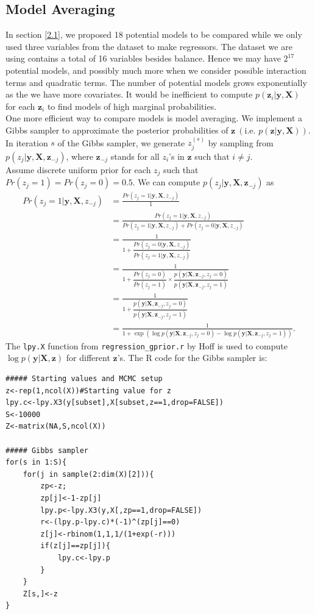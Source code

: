 \documentclass[a4page]{article}
\begin{document}
	\subsection{Model Averaging\label{2.2}}
	In section \ref{2.1}, we proposed 18 potential models to be compared while we only used three variables from the dataset to make regressors. The dataset we are using contains a total of 16 variables besides balance. Hence we may have $2^{17}$ potential models, and possibly much more when we consider possible interaction terms and quadratic terms. The number of potential models grows exponentially as the we have more covariates. It would be inefficient to compute $p(\bm{z}_i|\bm{y},\bm{X})$ for each $\bm{z}_i$ to find models of high marginal probabilities.\\
	One more efficient way to compare models is model averaging. We implement a Gibbs sampler to approximate the posterior probabilities of $\bm{z}\ (\text{i.e. }p(\bm{z}|\bm{y},\bm{X}))$. In iteration $s$ of the Gibbs sampler, we generate $z_j^{(s)}$ by sampling from $p(z_j|\bm{y},\bm{X},\bm{z}_{-j})$, where $\bm{z}_{-j}$ stands for all $z_i$'s in $\bm{z}$ such that $i\neq j$.\\
	Assume discrete uniform prior for each $z_j$ such that $Pr(z_j=1)=Pr(z_j=0)=0.5$. We can compute $p(z_j|\bm{y},\bm{X},\bm{z}_{-j})$ as
	\begin{equation}
		\begin{split}
		Pr(z_j=1|\bm{y},\bm{X},z_{-j})
		&=\frac{Pr(z_j=1|\bm{y},\bm{X},z_{-j})}{1}\\
		&=\frac{Pr(z_j=1|\bm{y},\bm{X},z_{-j})}{Pr(z_j=1|\bm{y},\bm{X},z_{-j})+Pr(z_j=0|\bm{y},\bm{X},z_{-j})}\\
		&=\frac{1}{1+\dfrac{Pr(z_j=0|\bm{y},\bm{X},z_{-j})}{Pr(z_j=1|\bm{y},\bm{X},z_{-j})}}\\
		&=\frac{1}{1+\dfrac{Pr(z_j=0)}{Pr(z_j=1)}\times\dfrac{p(\bm{y}|\bm{X},\bm{z}_{-j},z_j=0)}{p(\bm{y}|\bm{X},\bm{z}_{-j},z_j=1)}}\\
		&=\frac{1}{1+\dfrac{p(\bm{y}|\bm{X},\bm{z}_{-j},z_j=0)}{p(\bm{y}|\bm{X},\bm{z}_{-j},z_j=1)}}\\
		&=\frac{1}{1+ \exp (\log p(\bm{y}|\bm{X},\bm{z}_{-j},z_j=0) - \log p(\bm{y}|\bm{X},\bm{z}_{-j},z_j=1))}.
		\end{split}
	\end{equation}
	The \verb|lpy.X| function from \verb|regression_gprior.r| by Hoff is used to compute $\log p(\bm{y}|\bm{X},\bm{z})$ for different $\bm{z}$'s. The R code for the Gibbs sampler is:
\begin{verbatim}
##### Starting values and MCMC setup
z<-rep(1,ncol(X))#Starting value for z
lpy.c<-lpy.X3(y[subset],X[subset,z==1,drop=FALSE])
S<-10000
Z<-matrix(NA,S,ncol(X))

##### Gibbs sampler
for(s in 1:S){
    for(j in sample(2:dim(X)[2])){
        zp<-z;
        zp[j]<-1-zp[j]
        lpy.p<-lpy.X3(y,X[,zp==1,drop=FALSE])
        r<-(lpy.p-lpy.c)*(-1)^(zp[j]==0)
        z[j]<-rbinom(1,1,1/(1+exp(-r)))
        if(z[j]==zp[j]){
            lpy.c<-lpy.p
        }
    }
    Z[s,]<-z
}
\end{verbatim}
\end{document}
